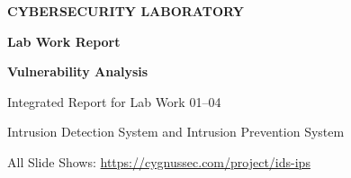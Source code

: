 \begin{frame}[plain]
  \vfill
  {\color{ResearchColor}\fontsize{15}{18}\selectfont\bfseries CYBERSECURITY LABORATORY\par}
  \vspace{0.15cm}
  {\color{SecondaryColor}\fontsize{17}{20}\selectfont\bfseries Lab Work Report\par}
  \vspace{0.22cm}
  {\color{TitleColor}\fontsize{27}{32}\selectfont\bfseries Vulnerability Analysis\par}
  \vspace{0.25cm}
  {\color{ResearchColor}\fontsize{17}{21}\selectfont
    Integrated Report for Lab Work 01--04\par}
  \vspace{0.20cm}
  {\color{SecondaryColor}\fontsize{13}{16}\selectfont
    Intrusion Detection System and Intrusion Prevention System\par}
  \vfill
  {\color{SecondaryColor}\fontsize{12}{15}\selectfont All Slide Shows: \url{https://cygnussec.com/project/ids-ips}\par}
\end{frame}